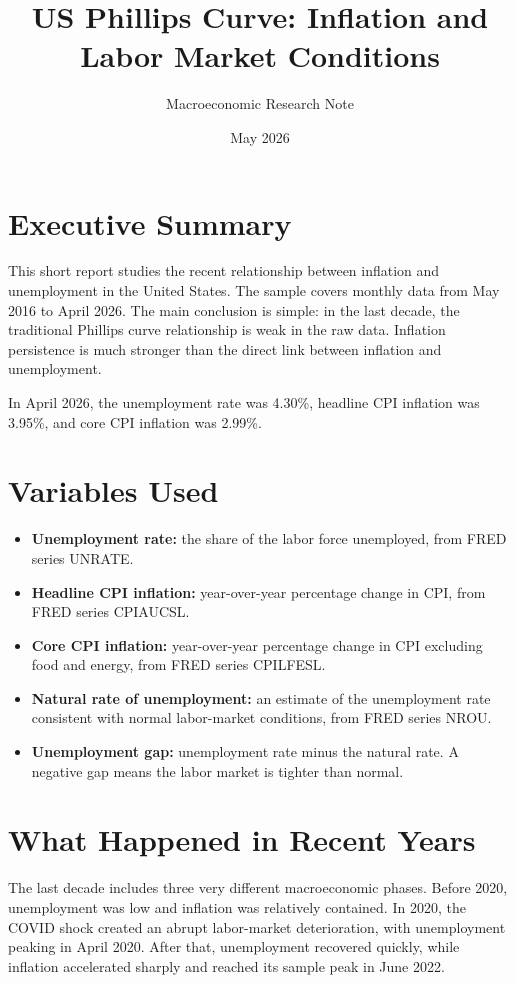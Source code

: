 \documentclass[11pt]{article}
\title{US Phillips Curve: Inflation and Labor Market Conditions}
\author{Macroeconomic Research Note}
\date{May 2026}
\begin{document}
\maketitle

\section*{Executive Summary}
This short report studies the recent relationship between inflation and unemployment in the United States. The sample covers monthly data from May 2016 to April 2026. The main conclusion is simple: in the last decade, the traditional Phillips curve relationship is weak in the raw data. Inflation persistence is much stronger than the direct link between inflation and unemployment.

In April 2026, the unemployment rate was 4.30\%, headline CPI inflation was 3.95\%, and core CPI inflation was 2.99\%.

\section*{Variables Used}
\begin{itemize}
    \item \textbf{Unemployment rate:} the share of the labor force unemployed, from FRED series UNRATE.
    \item \textbf{Headline CPI inflation:} year-over-year percentage change in CPI, from FRED series CPIAUCSL.
    \item \textbf{Core CPI inflation:} year-over-year percentage change in CPI excluding food and energy, from FRED series CPILFESL.
    \item \textbf{Natural rate of unemployment:} an estimate of the unemployment rate consistent with normal labor-market conditions, from FRED series NROU.
    \item \textbf{Unemployment gap:} unemployment rate minus the natural rate. A negative gap means the labor market is tighter than normal.
\end{itemize}

\section*{What Happened in Recent Years}
The last decade includes three very different macroeconomic phases. Before 2020, unemployment was low and inflation was relatively contained. In 2020, the COVID shock created an abrupt labor-market deterioration, with unemployment peaking in April 2020. After that, unemployment recovered quickly, while inflation accelerated sharply and reached its sample peak in June 2022.
\end{document}
